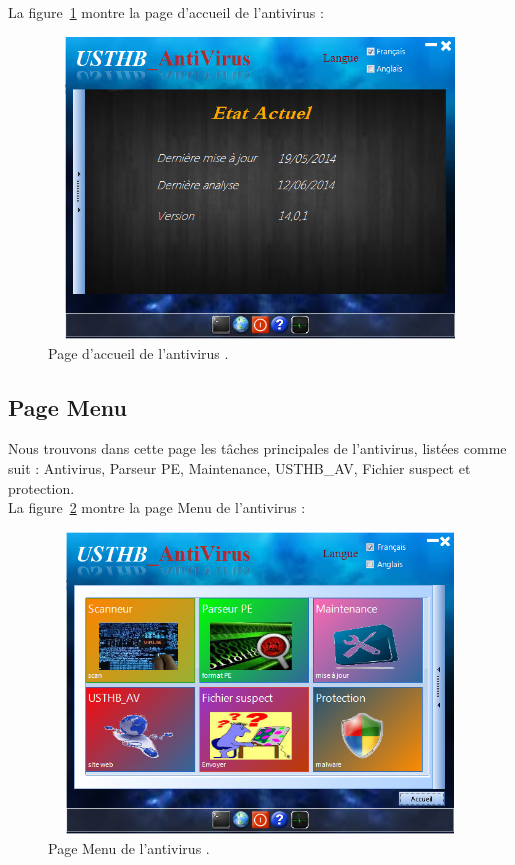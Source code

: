La figure~\ref{fig :ant1} montre la page d'accueil de l'antivirus :
\begin{figure}[H]
\begin{center}
\includegraphics[width=13cm, height=8cm]{Figures/ant1.png}
\caption{Page d'accueil de l'antivirus .}
\label{fig :ant1} 
\end{center}
\end{figure}
\subsection{Page Menu}
Nous trouvons dans cette page les tâches principales de l'antivirus, listées comme suit : Antivirus, Parseur PE, Maintenance, USTHB\_AV, Fichier suspect et protection.\\
La figure~\ref{fig :ant6} montre la page Menu de l'antivirus :
\begin{figure}[H]
\begin{center}
\includegraphics[width=13cm, height=8cm]{Figures/ant6.png}
\caption{Page Menu de l'antivirus .}
\label{fig :ant6} 
\end{center}
\end{figure}
